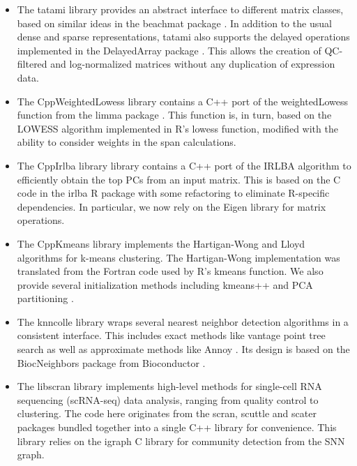 \documentclass{article}
\begin{document}
\begin{itemize}
\item The tatami library \cite{tatami} provides an abstract interface to different matrix classes, 
based on similar ideas in the beachmat package \cite{lun2018beachmat}. 
In addition to the usual dense and sparse representations, tatami also supports the delayed operations implemented in the DelayedArray package \cite{delayedarray}.
This allows the creation of QC-filtered and log-normalized matrices without any duplication of expression data.
\item The CppWeightedLowess library \cite{cppweightedlowess} contains a C++ port of the weightedLowess function from the limma package \cite{ritchie2015limma}.
This function is, in turn, based on the LOWESS algorithm \cite{cleveland1979robust} implemented in R's lowess function, 
modified with the ability to consider weights in the span calculations.
\item The CppIrlba library \cite{cppirlba} library contains a C++ port of the IRLBA algorithm \cite{baglama2005augmented} to efficiently obtain the top PCs from an input matrix.
This is based on the C code in the irlba R package \cite{irlba} with some refactoring to eliminate R-specific dependencies.
In particular, we now rely on the Eigen library \cite{eigenweb} for matrix operations.
\item The CppKmeans library \cite{cppkmeans} implements the Hartigan-Wong \cite{hartiganwong} and Lloyd algorithms \cite{lloyd} for k-means clustering.
The Hartigan-Wong implementation was translated from the Fortran code used by R's kmeans function.
We also provide several initialization methods including kmeans++ \cite{vassilvitskii2006kmeanspp} and PCA partitioning \cite{su2007search}.
\item The knncolle library \cite{knncolle} wraps several nearest neighbor detection algorithms in a consistent interface. 
This includes exact methods like vantage point tree search \cite{yianilos1993data} as well as approximate methods like Annoy \cite{annoy}.
Its design is based on the BiocNeighbors package from Bioconductor \cite{biocneighbors}.
\item The libscran library \cite{libscran} implements high-level methods for single-cell RNA sequencing (scRNA-seq) data analysis, ranging from quality control to clustering.
The code here originates from the scran, scuttle and scater packages \cite{lun2016step,lun2017scater} bundled together into a single C++ library for convenience. 
This library relies on the igraph C library \cite{csardi2006igraph} for community detection from the SNN graph.

\end{itemize}
\end{document}
